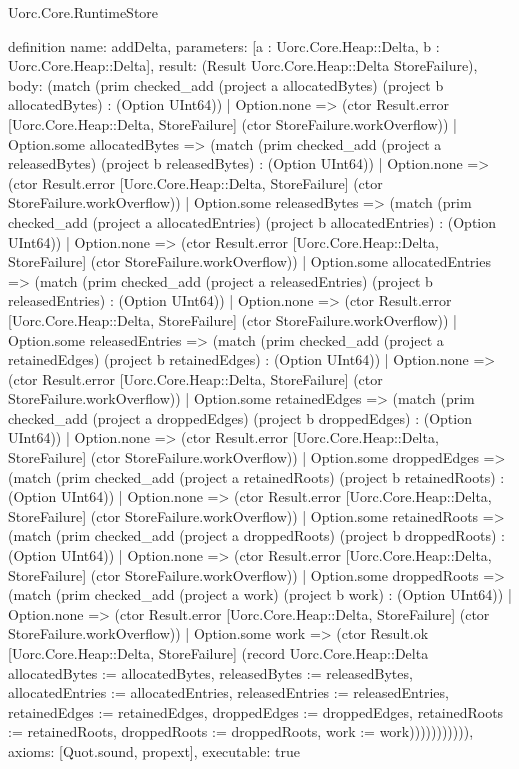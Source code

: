 \begin{lexlean}{Uorc.Core.RuntimeStore}
\begin{semanticmodule}
definition{
  name: addDelta,
  parameters: [a : Uorc.Core.Heap::Delta, b : Uorc.Core.Heap::Delta],
  result: (Result Uorc.Core.Heap::Delta StoreFailure),
  body: (match (prim checked_add (project a allocatedBytes) (project b allocatedBytes) : (Option UInt64))
    | Option.none => (ctor Result.error [Uorc.Core.Heap::Delta, StoreFailure] (ctor StoreFailure.workOverflow))
    | Option.some allocatedBytes => (match (prim checked_add (project a releasedBytes) (project b releasedBytes) : (Option UInt64))
      | Option.none => (ctor Result.error [Uorc.Core.Heap::Delta, StoreFailure] (ctor StoreFailure.workOverflow))
      | Option.some releasedBytes => (match (prim checked_add (project a allocatedEntries) (project b allocatedEntries) : (Option UInt64))
        | Option.none => (ctor Result.error [Uorc.Core.Heap::Delta, StoreFailure] (ctor StoreFailure.workOverflow))
        | Option.some allocatedEntries => (match (prim checked_add (project a releasedEntries) (project b releasedEntries) : (Option UInt64))
          | Option.none => (ctor Result.error [Uorc.Core.Heap::Delta, StoreFailure] (ctor StoreFailure.workOverflow))
          | Option.some releasedEntries => (match (prim checked_add (project a retainedEdges) (project b retainedEdges) : (Option UInt64))
            | Option.none => (ctor Result.error [Uorc.Core.Heap::Delta, StoreFailure] (ctor StoreFailure.workOverflow))
            | Option.some retainedEdges => (match (prim checked_add (project a droppedEdges) (project b droppedEdges) : (Option UInt64))
              | Option.none => (ctor Result.error [Uorc.Core.Heap::Delta, StoreFailure] (ctor StoreFailure.workOverflow))
              | Option.some droppedEdges => (match (prim checked_add (project a retainedRoots) (project b retainedRoots) : (Option UInt64))
                | Option.none => (ctor Result.error [Uorc.Core.Heap::Delta, StoreFailure] (ctor StoreFailure.workOverflow))
                | Option.some retainedRoots => (match (prim checked_add (project a droppedRoots) (project b droppedRoots) : (Option UInt64))
                  | Option.none => (ctor Result.error [Uorc.Core.Heap::Delta, StoreFailure] (ctor StoreFailure.workOverflow))
                  | Option.some droppedRoots => (match (prim checked_add (project a work) (project b work) : (Option UInt64))
                    | Option.none => (ctor Result.error [Uorc.Core.Heap::Delta, StoreFailure] (ctor StoreFailure.workOverflow))
                    | Option.some work => (ctor Result.ok [Uorc.Core.Heap::Delta, StoreFailure] (record Uorc.Core.Heap::Delta {allocatedBytes := allocatedBytes, releasedBytes := releasedBytes, allocatedEntries := allocatedEntries, releasedEntries := releasedEntries, retainedEdges := retainedEdges, droppedEdges := droppedEdges, retainedRoots := retainedRoots, droppedRoots := droppedRoots, work := work}))))))))))),
  axioms: [Quot.sound, propext],
  executable: true
}


\end{semanticmodule}
\end{lexlean}
